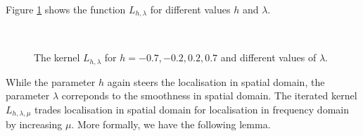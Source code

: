 \documentclass[11pt,a4paper,twoside,bibtotoc]{scrartcl}
\theoremstyle{plain}
\theoremstyle{definition}
\theoremstyle{remark}
\numberwithin{equation}{section}
\numberwithin{table}{section}
\numberwithin{figure}{section}
\begin{document}
Figure \ref{Basics:Figure:LKernel} shows the function $L_{h,\lambda}$ for
different values $h$ and $\lambda$.
\begin{figure}[tb]
  \centering
  \hfill
  \\
  \hfill
  \caption{The kernel $L_{h,\lambda}$ for $h = -0.7, -0.2, 0.2, 0.7$ and different values of $\lambda$.}
  \label{Basics:Figure:LKernel}
\end{figure}
While the parameter $h$ again steers the localisation in spatial domain, the
parameter $\lambda$ correponds to the smoothness in spatial domain.
The iterated kernel $L_{h,\lambda,\mu}$ trades localisation in spatial domain
for localisation in frequency domain by increasing $\mu$.
More formally, we have the following lemma.
\end{document}
